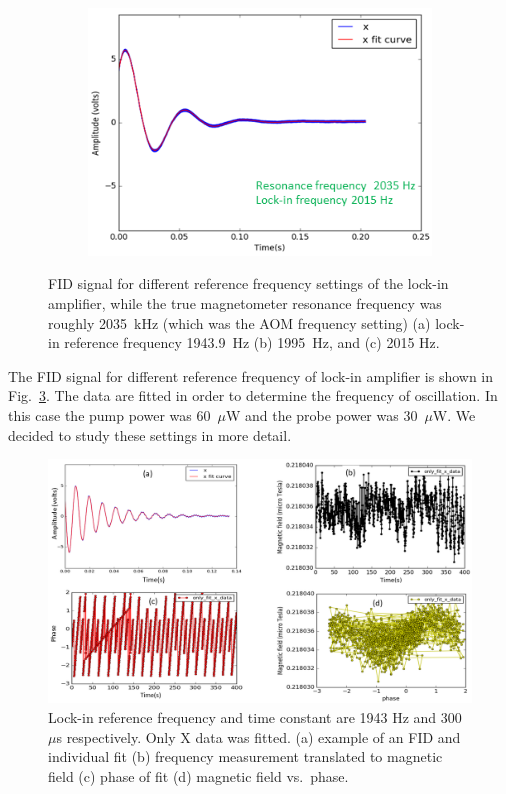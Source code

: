 \begin{figure}
\begin{subfigure}[b]{0.4\textwidth}
    \caption{}
    \label{fig: middle range}
  \end{subfigure}
  \begin{subfigure}[b]{0.4\textwidth}
    \centering
    \includegraphics[width=\textwidth]{figures/reference_frequency2}
    \caption{}
    \label{fig:close to resonance}
  \end{subfigure}
  \caption{FID signal for different reference frequency settings of
    the lock-in amplifier, while the true magnetometer resonance
    frequency was roughly 2035~kHz (which was the AOM frequency
    setting) (a) lock-in reference frequency 1943.9~Hz (b) 1995~Hz,
    and (c) 2015 Hz.\label{fig:different reference signal}}
\end{figure}

The FID signal for different reference frequency of lock-in amplifier
is shown in Fig.~\ref{fig:different reference signal}.  The data are
fitted in order to determine the frequency of oscillation.  In this
case the pump power was 60~$\mu$W and the probe power was 30~$\mu$W.
We decided to study these settings in more detail.

\begin{figure}%
\centering
\includegraphics[width=0.8\linewidth]{figures/freq_1943_single_fit_300microsec.png}
\caption{Lock-in reference frequency and time constant are 1943 Hz and
  300~$\mu$s respectively.  Only X data was fitted.  (a) example of an
  FID and individual fit (b) frequency measurement translated to
  magnetic field (c) phase of fit (d) magnetic field
  vs.~phase.\label{fig:freq_1943_single_fit_300_micros}}
\end{figure}

